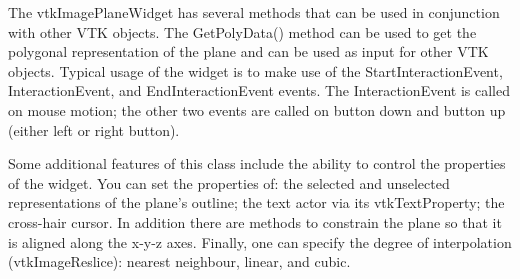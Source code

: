 The vtk\-Image\-Plane\-Widget has several methods that can be used in conjunction with other V\-T\-K objects. The Get\-Poly\-Data() method can be used to get the polygonal representation of the plane and can be used as input for other V\-T\-K objects. Typical usage of the widget is to make use of the Start\-Interaction\-Event, Interaction\-Event, and End\-Interaction\-Event events. The Interaction\-Event is called on mouse motion; the other two events are called on button down and button up (either left or right button).

Some additional features of this class include the ability to control the properties of the widget. You can set the properties of\-: the selected and unselected representations of the plane's outline; the text actor via its vtk\-Text\-Property; the cross-\/hair cursor. In addition there are methods to constrain the plane so that it is aligned along the x-\/y-\/z axes. Finally, one can specify the degree of interpolation (vtk\-Image\-Reslice)\-: nearest neighbour, linear, and cubic.

